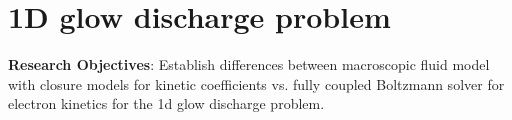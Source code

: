 \documentclass{article}[draft]
\begin{document}
\clearpage
\section{1D glow discharge problem}
\label{sec:1d_glow}
\textbf{Research Objectives}: 
Establish differences between macroscopic fluid model with closure models for kinetic coefficients vs. fully coupled Boltzmann solver for electron kinetics for the 1d glow discharge problem. 
\end{document}
